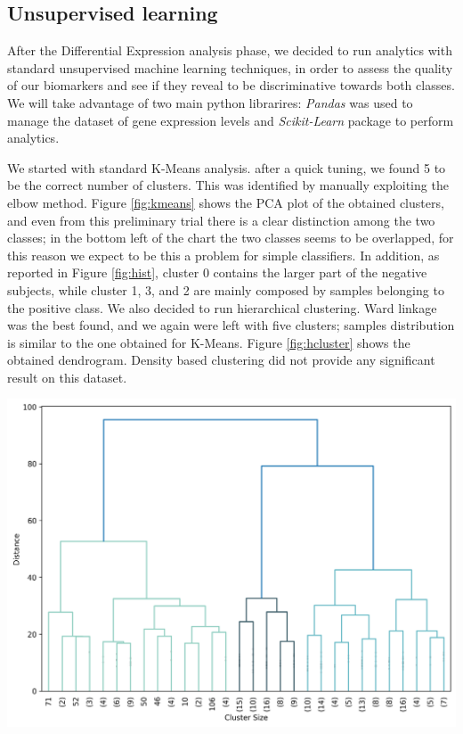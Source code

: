 \documentclass{article}
\newenvironment{Figure}
  {\par\medskip\noindent\minipage{\linewidth}}
  {\endminipage\par\medskip}
\begin{document}
\begin{multicols}{2}
\subsection{Unsupervised learning}
After the Differential Expression analysis phase, we decided to run analytics with standard unsupervised machine learning techniques, in order to assess the quality of our biomarkers and see if they reveal to be discriminative towards both classes. We will take advantage of two main python librarires: \textit{Pandas} \cite{reback2020pandas} was used to manage the dataset of gene expression levels and \textit{Scikit-Learn} \cite{scikitlearn} package to perform analytics. 

We started with standard K-Means analysis. after a quick tuning, we found 5 to be the correct number of clusters. This was identified by manually exploiting the elbow method. 
Figure \ref{fig:kmeans} shows the PCA plot of the obtained clusters, and even from this preliminary trial there is a clear distinction among the two classes; in the bottom left of the chart the two classes seems to be overlapped, for this reason we expect to be this a problem for simple classifiers. In addition, as reported in Figure \ref{fig:hist}, cluster 0 contains the larger part of the negative subjects, while cluster 1, 3, and 2 are mainly composed by samples belonging to the positive class. We also decided to run hierarchical clustering. Ward linkage was the best found, and we again were left with five clusters; samples distribution is similar to the one obtained for K-Means. Figure \ref{fig:hcluster} shows the obtained dendrogram. Density based clustering did not provide any significant result on this dataset.

\begin{Figure}
    \centering
    \includegraphics[width=\linewidth]{assets/hcluster.png} 
    \label{fig:hcluster}
\end{Figure}

\end{multicols}
\end{document}
